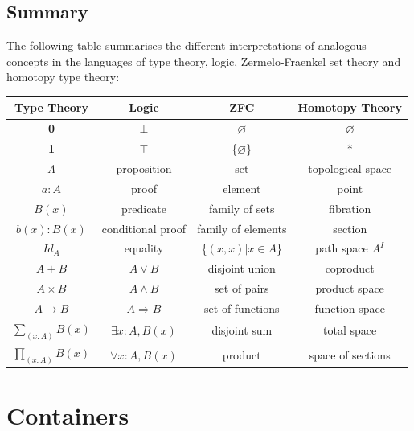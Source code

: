 \documentclass[12pt]{report}
\begin{document}
\pagebreak
\section{Summary}

The following table summarises the different interpretations of analogous concepts in the languages of type theory, logic, Zermelo-Fraenkel set theory and homotopy type theory:

\begin{center}
\begin{tabular}{| c | c | c | c |}
\hline
\textbf{Type Theory} & \textbf{Logic} & \textbf{ZFC} & \textbf{Homotopy Theory}\\
\hline
\textbf{0} & $\bot$ & $\varnothing$ &$\varnothing$\\
\textbf{1} & $\top$ & \{$\varnothing$\} &*\\
\textit{A} & proposition & set & topological space\\
$a : A$ & proof & element & point\\
$B(x)$ & predicate & family of sets & fibration\\
$b(x) : B(x)$ & conditional proof & family of elements & section\\
$ Id_A $ & equality & \{$ (x,x) | x \in A $\} & path space $A^{\textit{I}}$\\
$A + B$ & $A \vee B$ & disjoint union & coproduct\\
$ A \times B$ & $A \wedge B$ & set of pairs & product space\\
$A \rightarrow B$ & $A \Rightarrow B$ & set of functions & function space\\
$ \sum_{(x:A)}^{} B(x) $ & $\exists x:A, B(x) $ & disjoint sum & total space\\
$ \prod_{(x:A)}^{} B(x) $ & $\forall x:A, B(x) $ & product & space of sections\\
\hline
\end{tabular}
\end{center}


\chapter{Containers}
\end{document}
